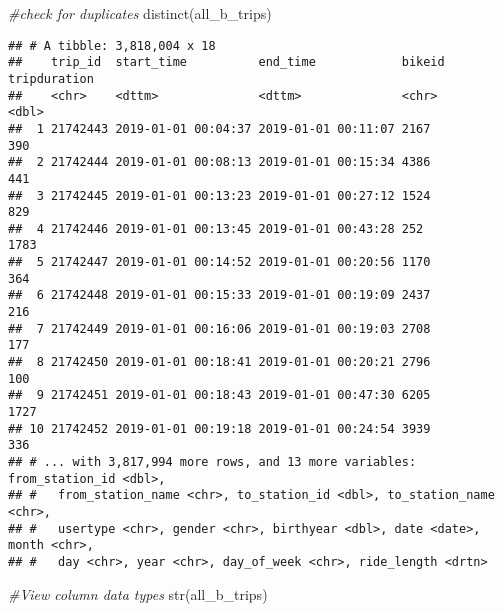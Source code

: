 \documentclass[
]{article}
\newenvironment{Shaded}{\begin{snugshade}}{\end{snugshade}}
\newcommand{\CommentTok}[1]{\textcolor[rgb]{0.56,0.35,0.01}{\textit{#1}}}
\newcommand{\FunctionTok}[1]{\textcolor[rgb]{0.00,0.00,0.00}{#1}}
\newcommand{\NormalTok}[1]{#1}
\begin{document}
\begin{Shaded}
\begin{Highlighting}[]
\CommentTok{\#check for duplicates}
\FunctionTok{distinct}\NormalTok{(all\_b\_trips)}
\end{Highlighting}
\end{Shaded}

\begin{verbatim}
## # A tibble: 3,818,004 x 18
##    trip_id  start_time          end_time            bikeid tripduration
##    <chr>    <dttm>              <dttm>              <chr>         <dbl>
##  1 21742443 2019-01-01 00:04:37 2019-01-01 00:11:07 2167            390
##  2 21742444 2019-01-01 00:08:13 2019-01-01 00:15:34 4386            441
##  3 21742445 2019-01-01 00:13:23 2019-01-01 00:27:12 1524            829
##  4 21742446 2019-01-01 00:13:45 2019-01-01 00:43:28 252            1783
##  5 21742447 2019-01-01 00:14:52 2019-01-01 00:20:56 1170            364
##  6 21742448 2019-01-01 00:15:33 2019-01-01 00:19:09 2437            216
##  7 21742449 2019-01-01 00:16:06 2019-01-01 00:19:03 2708            177
##  8 21742450 2019-01-01 00:18:41 2019-01-01 00:20:21 2796            100
##  9 21742451 2019-01-01 00:18:43 2019-01-01 00:47:30 6205           1727
## 10 21742452 2019-01-01 00:19:18 2019-01-01 00:24:54 3939            336
## # ... with 3,817,994 more rows, and 13 more variables: from_station_id <dbl>,
## #   from_station_name <chr>, to_station_id <dbl>, to_station_name <chr>,
## #   usertype <chr>, gender <chr>, birthyear <dbl>, date <date>, month <chr>,
## #   day <chr>, year <chr>, day_of_week <chr>, ride_length <drtn>
\end{verbatim}

\begin{Shaded}
\begin{Highlighting}[]
\CommentTok{\#View column data types}
\FunctionTok{str}\NormalTok{(all\_b\_trips)}
\end{Highlighting}
\end{Shaded}
\end{document}

